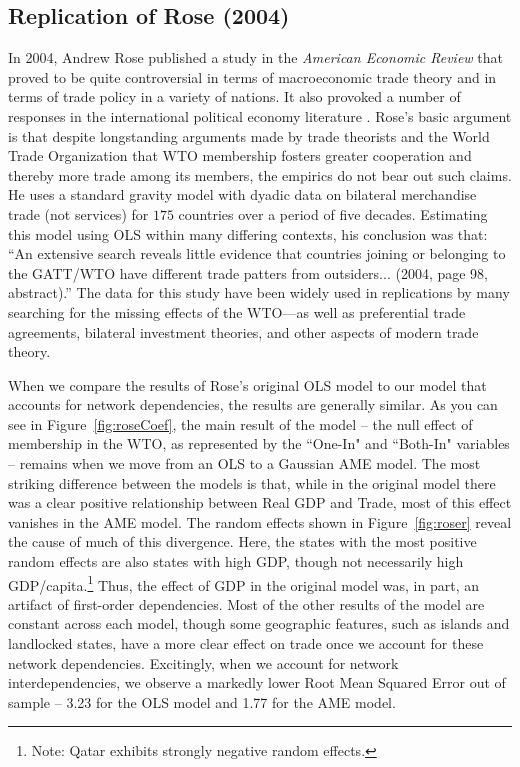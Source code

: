 \newpage
\subsection{Replication of Rose (2004)}

In 2004, Andrew Rose published a study in the \textit{American Economic Review} \nocite{rose:2004} that proved to be quite controversial in terms of macroeconomic trade theory and in terms of trade policy in a variety of nations. It also provoked a number of responses in the international political economy literature \cite{tomz:etal:2007,ward:etal:2013}.  Rose's basic argument is that despite longstanding arguments made by trade theorists and the World Trade Organization that WTO membership fosters greater cooperation and thereby more trade among its members, the empirics do not bear out such claims. He uses a standard gravity model with dyadic data on bilateral merchandise trade (not services) for $175$ countries over a period of five decades. Estimating this model using OLS within many differing contexts, his conclusion was that: ``An extensive search reveals little evidence that countries joining or belonging to the GATT/WTO have different trade patters from outsiders... (2004, page 98, abstract).''  The data for this study have been widely used in replications by many searching for the missing effects of the WTO---as well as preferential trade agreements, bilateral investment theories, and other aspects of modern trade theory.  

When we compare the results of Rose's original OLS model to our model that accounts for network dependencies, the results are generally similar. As you can see in Figure~\ref{fig:roseCoef}, the main result of the model -- the null effect of membership in the WTO, as represented by the ``One-In" and ``Both-In" variables -- remains when we move from an OLS to a Gaussian AME model. The most striking difference between the models is that, while in the original model there was a clear positive relationship between Real GDP and Trade, most of this effect vanishes in the AME model. The random effects shown in Figure~\ref{fig:roser} reveal the cause of much of this divergence. Here, the states with the most positive random effects are also states with high GDP, though not necessarily high GDP/capita.\footnote{Note: Qatar exhibits strongly negative random effects.} Thus, the effect of GDP in the original model was, in part, an artifact of first-order dependencies. Most of the other results of the model are constant across each model, though some geographic features, such as islands and landlocked states, have a more clear effect on trade once we account for these network dependencies. Excitingly, when we account for network interdependencies, we observe a markedly lower Root Mean Squared Error out of sample -- 3.23 for the OLS model and 1.77 for the AME model.

